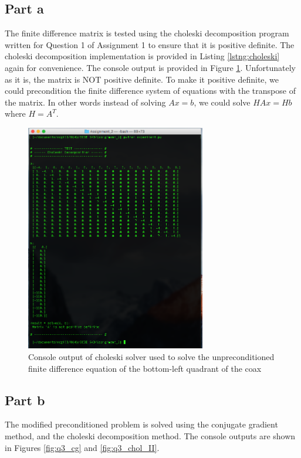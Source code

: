 \documentclass[11pt]{amsart}
\begin{document}
\subsection*{Part a}
The finite difference matrix is tested using the choleski decomposition program written for Question 1 of Assignment 1 to ensure that it is positive definite. The choleski decomposition implementation is provided in Listing \ref{lstng:choleski} again for convenience. The console output is provided in Figure \ref{fig:q3_chol}. Unfortunately as it is, the matrix is NOT positive definite. To make it positive definite, we could precondition the finite difference system of equations with the transpose of the matrix. In other words instead of solving $Ax = b$, we could solve $HAx = Hb$ where $H=A^T$.
\begin{figure}[h!]
    \includegraphics[width=0.7\textwidth]{assets/q3_chol}
    \caption{Console output of choleski solver used to solve the unpreconditioned finite difference equation of the bottom-left quadrant of the coax}
    \label{fig:q3_chol}
\end{figure}

\pagebreak

\subsection*{Part b}
The modified preconditioned problem is solved using the conjugate gradient method, and the choleski decomposition method. The console outputs are shown in Figures \ref{fig:q3_cg} and \ref{fig:q3_chol_II}.
\end{document}
